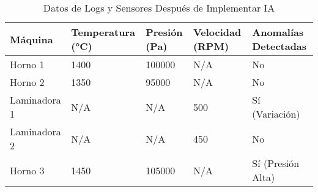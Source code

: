\begin{table}[htbp]
\centering
\caption{Datos de Logs y Sensores Después de Implementar IA}
\label{tab:despues-ia}
\begin{tabularx}{\textwidth}{|X|X|X|X|X|}
\hline
\textbf{Máquina} & \textbf{Temperatura (°C)} & \textbf{Presión (Pa)} & \textbf{Velocidad (RPM)} & \textbf{Anomalías Detectadas} \\
\hline
Horno 1 & 1400 & 100000 & N/A & No \\
\hline
Horno 2 & 1350 & 95000 & N/A & No \\
\hline
Laminadora 1 & N/A & N/A & 500 & Sí (Variación) \\
\hline
Laminadora 2 & N/A & N/A & 450 & No \\
\hline
Horno 3 & 1450 & 105000 & N/A & Sí (Presión Alta) \\
\hline
\end{tabularx}
\end{table}





